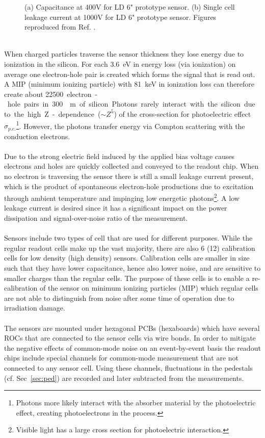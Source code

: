\documentclass[../../main.tex]{subfiles}
\begin{document}
\begin{figure}[htp]
	\centering
	\caption{(a) Capacitance at 400V for LD 6" prototype sensor. (b) Single cell leakage current at 1000V for LD 6" prototype sensor. Figures reproduced from Ref. \cite{sensor}.} \label{fig:sens_plots}
\end{figure}
\\
When charged particles traverse the sensor thickness they lose energy due to ionization in the silicon. For each \SI{3.6}{eV} in energy loss (via ionization) on average one electron-hole pair is created which forms the signal that is read out. A MIP (minimum ionizing particle) with \SI{81}{keV} in ionization loss can therefore create about \SI{22500} electron-hole pairs in \SI{300}{\mu m} of silicon. Photons rarely interact with the silicon due to the high Z-dependence ($\sim Z^5$) of the cross-section for photoelectric effect $\sigma_{p.e.}$\footnote{Photons more likely interact with the absorber material by the photoelectric effect, creating photoelectrons in the process.}. However, the photons transfer energy via Compton scattering with the conduction electrons.\\
\\
Due to the strong electric field induced by the applied bias voltage causes electrons and holes are quickly collected and conveyed to the readout chip. When no electron is traversing the sensor there is still a small leakage current present, which is the product of spontaneous electron-hole productions due to excitation through ambient temperature and impinging low energetic photons\footnote{Visible light has a large cross section for photoelectric interaction.}. A low leakage current is desired since it has a significant impact on the power dissipation and signal-over-noise ratio of the measurement.\\
\\
Sensors include two types of cell that are used for different purposes. While the regular readout cells make up the vast majority, there are also 6 (12) calibration cells for low density (high density) sensors. Calibration cells are smaller in size such that they have lower capacitance, hence also lower noise, and are sensitive to smaller charges than the regular cells. The purpose of these cells is to enable a re-calibration of the sensor on minimum ionizing particles (MIP) which regular cells are not able to distinguish from noise after some time of operation due to irradiation damage.\\
\\
The sensors are mounted under hexagonal PCBs (hexaboards) which have several ROCs that are connected to the sensor cells via wire bonds. In order to mitigate the negative effects of common-mode noise on an event-by-event basis the readout chips include special channels for common-mode measurement that are not connected to any sensor cell. Using these channels, fluctuations in the pedestals (cf. Sec~\ref{sec:ped}) are recorded and later subtracted from the measurements.
\end{document}
